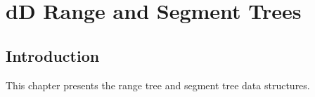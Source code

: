\def\ccTagRmEigenClassName{\ccFalse}
\def\ccLongParamLayout{\ccTrue}

\ccThreeToTwo

\chapter{dD Range and Segment Trees} 
\label{Trees}



\section{Introduction}

This chapter presents the {\cgal} range tree and segment tree
data structures. 








